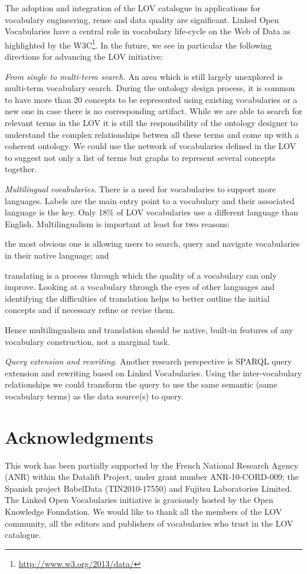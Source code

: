 \documentclass{iosart2c}
\begin{document}
The adoption and integration of the LOV catalogue in applications for vocabulary engineering, reuse and data quality are significant. Linked Open Vocabularies have a central role in vocabulary life-cycle on the Web of Data as highlighted by the W3C\footnote{\url{http://www.w3.org/2013/data/}}. In the future, we see in particular the following directions for advancing the LOV initiative:

\emph{From single to multi-term search.} An area which is still largely unexplored is multi-term vocabulary search. During the ontology design process, it is common to have more than 20 concepts to be represented using existing vocabularies or a new one in case there is no corresponding artifact. While we are able to search for relevant terms in the LOV it is still the responsibility of the ontology designer to understand the complex relationships betwen all these terms and come up with a coherent ontology. We could use the network of vocabularies defined in the LOV to suggest not only a list of terms but graphs to represent several concepts together.

\emph{Multilingual vocabularies.} There is a need for vocabularies to support more languages. Labels are the main entry point to a vocabulary and their associated language is the key. Only 18\% of LOV vocabularies use a different language than English. Multilingualism is important at least for two reasons: 
\begin{inparaenum}[1)] 
	\item the most obvious one is allowing users to search, query and navigate vocabularies in their native language; and
	\item translating is a process through which the quality of a vocabulary can only improve. Looking at a vocabulary through the eyes of other languages and identifying the difficulties of translation helps to better outline the initial concepts and if necessary refine or revise them. 
\end{inparaenum} 
Hence multilingualism and translation should be native, built-in features of any vocabulary construction, not a marginal task.

\emph{Query extension and rewriting.} Another research perspective is SPARQL query extension and rewriting based on Linked Vocabularies. Using the inter-vocabulary relationships we could transform the query to use the same semantic (same vocabulary terms) as the data source(s) to query.

\section*{Acknowledgments}
This work has been partially supported by the French National Research Agency (ANR) within the Datalift Project, under grant number ANR-10-CORD-009; the Spanish project BabelData (TIN2010-17550) and Fujitsu Laboratories Limited. The Linked Open Vocabularies initiative is graciously hosted by the Open Knowledge Foundation. We would like to thank all the members of the LOV community, all the editors and publishers of vocabularies who trust in the LOV catalogue. 




\end{document}
